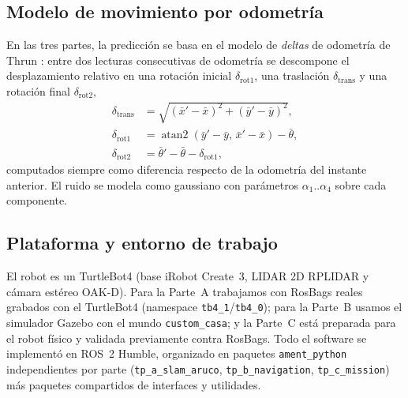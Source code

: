 \documentclass[conference]{IEEEtran}
\begin{document}
\subsection{Modelo de movimiento por odometría}
En las tres partes, la predicción se basa en el modelo de \emph{deltas} de odometría de Thrun \cite{thrun}: entre dos lecturas consecutivas de odometría se descompone el desplazamiento relativo en una rotación inicial $\delta_{\text{rot1}}$, una traslación $\delta_{\text{trans}}$ y una rotación final $\delta_{\text{rot2}}$,
\begin{align}
\delta_{\text{trans}} &= \sqrt{(\bar{x}'-\bar{x})^2+(\bar{y}'-\bar{y})^2},\\
\delta_{\text{rot1}} &= \operatorname{atan2}(\bar{y}'-\bar{y},\,\bar{x}'-\bar{x})-\bar{\theta},\\
\delta_{\text{rot2}} &= \bar{\theta}'-\bar{\theta}-\delta_{\text{rot1}},
\end{align}
computados siempre como diferencia respecto de la odometría del instante anterior. El ruido se modela como gaussiano con parámetros $\alpha_1..\alpha_4$ sobre cada componente.

\subsection{Plataforma y entorno de trabajo}
El robot es un TurtleBot4 (base iRobot Create~3, LIDAR 2D RPLIDAR y cámara estéreo OAK-D). Para la Parte~A trabajamos con RosBags reales grabados con el TurtleBot4 (namespace \texttt{tb4\_1}/\texttt{tb4\_0}); para la Parte~B usamos el simulador Gazebo con el mundo \texttt{custom\_casa}; y la Parte~C está preparada para el robot físico y validada previamente contra RosBags. Todo el software se implementó en ROS~2 Humble, organizado en paquetes \texttt{ament\_python} independientes por parte (\texttt{tp\_a\_slam\_aruco}, \texttt{tp\_b\_navigation}, \texttt{tp\_c\_mission}) más paquetes compartidos de interfaces y utilidades.






\end{document}
